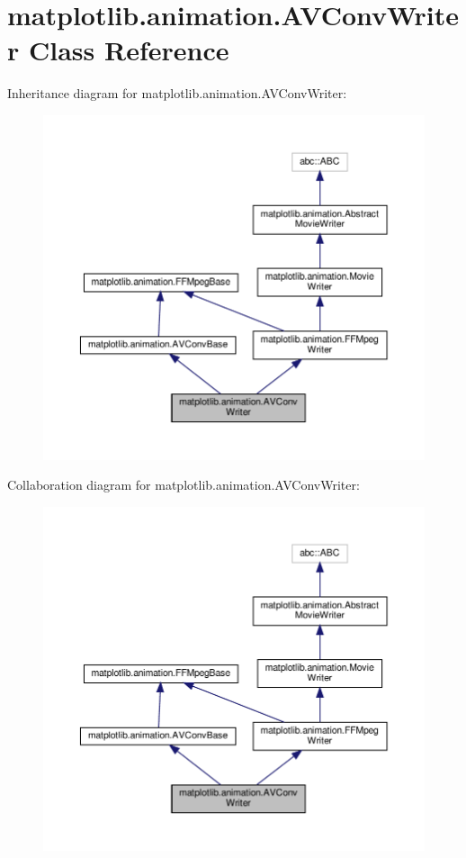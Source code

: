 \hypertarget{classmatplotlib_1_1animation_1_1AVConvWriter}{}\section{matplotlib.\+animation.\+A\+V\+Conv\+Writer Class Reference}
\label{classmatplotlib_1_1animation_1_1AVConvWriter}


Inheritance diagram for matplotlib.\+animation.\+A\+V\+Conv\+Writer\+:
\nopagebreak
\begin{figure}[H]
\begin{center}
\leavevmode
\includegraphics[width=350pt]{classmatplotlib_1_1animation_1_1AVConvWriter__inherit__graph}
\end{center}
\end{figure}


Collaboration diagram for matplotlib.\+animation.\+A\+V\+Conv\+Writer\+:
\nopagebreak
\begin{figure}[H]
\begin{center}
\leavevmode
\includegraphics[width=350pt]{classmatplotlib_1_1animation_1_1AVConvWriter__coll__graph}
\end{center}
\end{figure}
